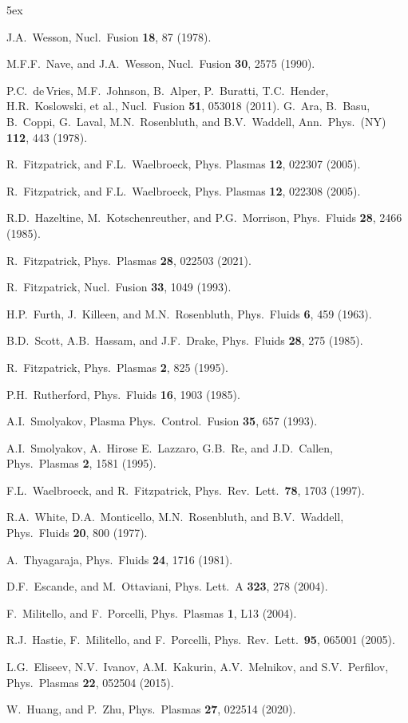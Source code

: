 \documentclass[12pt,prb,aps]{revtex4-1}
\begin{document}
\begin{thebibliography}{99}\baselineskip 5ex

 J.A.~Wesson, Nucl.\ Fusion {\bf 18}, 87 (1978).

 M.F.F.~Nave, and J.A.~Wesson, Nucl.\ Fusion {\bf 30}, 2575 (1990).

 P.C.~de\,Vries, M.F.~Johnson, B.~Alper, P.~Buratti, T.C.~Hender, H.R.~Koslowski, et al., Nucl.\ Fusion {\bf 51}, 053018 (2011).
 G.~Ara, B.~Basu, B.~Coppi, G.~Laval, M.N.~Rosenbluth, and B.V.~Waddell, Ann.\ Phys.\ (NY) {\bf 112}, 443 (1978).

 R.~Fitzpatrick, and F.L.~Waelbroeck, Phys. Plasmas {\bf 12}, 022307 (2005).

 R.~Fitzpatrick, and F.L.~Waelbroeck, Phys. Plasmas {\bf 12}, 022308 (2005).

 R.D.~Hazeltine, M.~Kotschenreuther, and P.G.~Morrison, Phys.\ Fluids {\bf 28}, 2466 (1985).

 R.~Fitzpatrick, Phys.\ Plasmas {\bf 28}, 022503 (2021). 

 R.~Fitzpatrick, Nucl.\ Fusion {\bf 33}, 1049 (1993).

 H.P.~Furth, J.~Killeen, and M.N.~Rosenbluth, Phys.\ Fluids {\bf 6}, 459 (1963).

 B.D.~Scott,  A.B.~Hassam, and J.F.~Drake, Phys.\ Fluids {\bf 28}, 275 (1985). 

 R.~Fitzpatrick, Phys.\ Plasmas {\bf 2}, 825 (1995). 

 P.H.~Rutherford, Phys.\ Fluids {\bf 16}, 1903 (1985). 

 A.I.~Smolyakov, Plasma Phys.\ Control.\ Fusion {\bf 35}, 657 (1993).

 A.I.~Smolyakov, A.~Hirose E.~Lazzaro, G.B.~Re, and  J.D.~Callen, Phys.\ Plasmas {\bf 2}, 1581 (1995). 

 F.L.~Waelbroeck, and R.~Fitzpatrick, Phys.\ Rev.\ Lett.\ {\bf 78}, 1703 (1997). 

 R.A.~White, D.A.~Monticello, M.N.~Rosenbluth, and B.V.~Waddell, Phys.\ Fluids {\bf 20}, 800 (1977). 

 A.~Thyagaraja, Phys.\ Fluids {\bf 24}, 1716 (1981). 

 D.F.~Escande, and M.~Ottaviani, Phys. Lett.\ A {\bf 323}, 278 (2004).

 F.~Militello, and F.~Porcelli, Phys.\ Plasmas {\bf 1}, L13 (2004).

 R.J.~Hastie, F.~Militello, and F.~Porcelli, Phys.\ Rev.\ Lett.\ {\bf 95}, 065001 (2005).

 L.G.~Eliseev, N.V.~Ivanov, A.M.~Kakurin, A.V.~Melnikov, and S.V.~Perfilov,
Phys.\ Plasmas {\bf 22}, 052504 (2015).

 W.~Huang, and P.~Zhu, Phys.\ Plasmas {\bf 27}, 022514 (2020).

\end{thebibliography}
\end{document}
